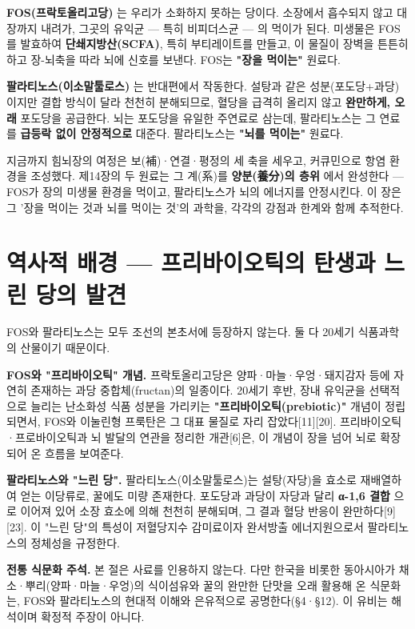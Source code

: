 \documentclass[11pt,oneside]{book}
\newenvironment{authnote}
  {\par\smallskip\begingroup\leftskip=7mm\rightskip=5mm\small\color{muted}\noindent\ignorespaces}
  {\par\endgroup\smallskip}
\begin{document}
\textbf{FOS(프락토올리고당)} 는 우리가 소화하지 못하는 당이다. 소장에서 흡수되지 않고 대장까지 내려가, 그곳의 유익균 — 특히 비피더스균 — 의 먹이가 된다. 미생물은 FOS를 발효하여 \textbf{단쇄지방산(SCFA)}, 특히 부티레이트를 만들고, 이 물질이 장벽을 튼튼히 하고 장-뇌축을 따라 뇌에 신호를 보낸다. FOS는 \textbf{"장을 먹이는"} 원료다.

\textbf{팔라티노스(이소말툴로스)} 는 반대편에서 작동한다. 설탕과 같은 성분(포도당+과당)이지만 결합 방식이 달라 천천히 분해되므로, 혈당을 급격히 올리지 않고 \textbf{완만하게, 오래} 포도당을 공급한다. 뇌는 포도당을 유일한 주연료로 삼는데, 팔라티노스는 그 연료를 \textbf{급등락 없이 안정적으로} 대준다. 팔라티노스는 \textbf{"뇌를 먹이는"} 원료다.

지금까지 힘뇌장의 여정은 보(補)·연결·평정의 세 축을 세우고, 커큐민으로 항염 환경을 조성했다. 제14장의 두 원료는 그 계(系)를 \textbf{양분(養分)의 층위} 에서 완성한다 — FOS가 장의 미생물 환경을 먹이고, 팔라티노스가 뇌의 에너지를 안정시킨다. 이 장은 그 '장을 먹이는 것과 뇌를 먹이는 것'의 과학을, 각각의 강점과 한계와 함께 추적한다.

\section{역사적 배경 — 프리바이오틱의 탄생과 느린 당의 발견}
FOS와 팔라티노스는 모두 조선의 본초서에 등장하지 않는다. 둘 다 20세기 식품과학의 산물이기 때문이다.

\textbf{FOS와 "프리바이오틱" 개념.} 프락토올리고당은 양파·마늘·우엉·돼지감자 등에 자연히 존재하는 과당 중합체(fructan)의 일종이다. 20세기 후반, 장내 유익균을 선택적으로 늘리는 난소화성 식품 성분을 가리키는 \textbf{"프리바이오틱(prebiotic)"} 개념이 정립되면서, FOS와 이눌린형 프룩탄은 그 대표 물질로 자리 잡았다[11][20]. 프리바이오틱·프로바이오틱과 뇌 발달의 연관을 정리한 개관[6]은, 이 개념이 장을 넘어 뇌로 확장되어 온 흐름을 보여준다.

\textbf{팔라티노스와 "느린 당".} 팔라티노스(이소말툴로스)는 설탕(자당)을 효소로 재배열하여 얻는 이당류로, 꿀에도 미량 존재한다. 포도당과 과당이 자당과 달리 \textbf{α-1,6 결합} 으로 이어져 있어 소장 효소에 의해 천천히 분해되며, 그 결과 혈당 반응이 완만하다[9][23]. 이 "느린 당"의 특성이 저혈당지수 감미료이자 완서방출 에너지원으로서 팔라티노스의 정체성을 규정한다.

\begin{authnote}\textbf{전통 식문화 주석.} 본 절은 사료를 인용하지 않는다. 다만 한국을 비롯한 동아시아가 채소·뿌리(양파·마늘·우엉)의 식이섬유와 꿀의 완만한 단맛을 오래 활용해 온 식문화는, FOS와 팔라티노스의 현대적 이해와 은유적으로 공명한다(§4·§12). 이 유비는 해석이며 확정적 주장이 아니다.\end{authnote}
\end{document}
